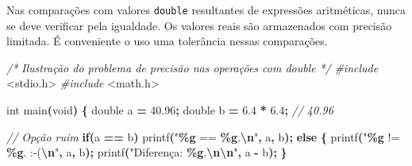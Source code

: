 \documentclass[
  11pt,
  a4paper,
]{scrbook}
\newenvironment{Shaded}{\begin{snugshade}}{\end{snugshade}}
\newcommand{\CommentTok}[1]{\textcolor[rgb]{0.56,0.35,0.01}{\textit{#1}}}
\newcommand{\ControlFlowTok}[1]{\textcolor[rgb]{0.13,0.29,0.53}{\textbf{#1}}}
\newcommand{\DataTypeTok}[1]{\textcolor[rgb]{0.13,0.29,0.53}{#1}}
\newcommand{\FloatTok}[1]{\textcolor[rgb]{0.00,0.00,0.81}{#1}}
\newcommand{\ImportTok}[1]{#1}
\newcommand{\NormalTok}[1]{#1}
\newcommand{\OperatorTok}[1]{\textcolor[rgb]{0.81,0.36,0.00}{\textbf{#1}}}
\newcommand{\PreprocessorTok}[1]{\textcolor[rgb]{0.56,0.35,0.01}{\textit{#1}}}
\newcommand{\SpecialCharTok}[1]{\textcolor[rgb]{0.81,0.36,0.00}{\textbf{#1}}}
\newcommand{\StringTok}[1]{\textcolor[rgb]{0.31,0.60,0.02}{#1}}
\begin{document}
\begin{tcolorbox}[enhanced jigsaw, arc=.35mm, bottomtitle=1mm, colbacktitle=quarto-callout-tip-color!10!white, title=\textcolor{quarto-callout-tip-color}{\faLightbulb}\hspace{0.5em}{Dica}, toprule=.15mm, left=2mm, opacityback=0, colback=white, colframe=quarto-callout-tip-color-frame, opacitybacktitle=0.6, bottomrule=.15mm, leftrule=.75mm, toptitle=1mm, coltitle=black, titlerule=0mm, rightrule=.15mm, breakable]

Nas comparações com valores \texttt{double} resultantes de expressões
aritméticas, nunca se deve verificar pela igualdade. Os valores reais
são armazenados com precisão limitada. É conveniente o uso uma
tolerância nessas comparações.

\begin{Shaded}
\begin{Highlighting}[]
\CommentTok{/* }
\CommentTok{Ilustração do problema de precisão nas operações com double}
\CommentTok{*/}
\PreprocessorTok{\#include }\ImportTok{\textless{}stdio.h\textgreater{}}
\PreprocessorTok{\#include }\ImportTok{\textless{}math.h\textgreater{}}

\DataTypeTok{int}\NormalTok{ main}\OperatorTok{(}\DataTypeTok{void}\OperatorTok{)} \OperatorTok{\{}
    \DataTypeTok{double}\NormalTok{ a }\OperatorTok{=} \FloatTok{40.96}\OperatorTok{;}
    \DataTypeTok{double}\NormalTok{ b }\OperatorTok{=} \FloatTok{6.4} \OperatorTok{*} \FloatTok{6.4}\OperatorTok{;}  \CommentTok{// 40.96}

    \CommentTok{// Opção ruim}
    \ControlFlowTok{if}\OperatorTok{(}\NormalTok{a }\OperatorTok{==}\NormalTok{ b}\OperatorTok{)}
\NormalTok{        printf}\OperatorTok{(}\StringTok{"}\SpecialCharTok{\%g}\StringTok{ == }\SpecialCharTok{\%g}\StringTok{.}\SpecialCharTok{\textbackslash{}n}\StringTok{"}\OperatorTok{,}\NormalTok{ a}\OperatorTok{,}\NormalTok{ b}\OperatorTok{);}
    \ControlFlowTok{else} \OperatorTok{\{}
\NormalTok{        printf}\OperatorTok{(}\StringTok{"}\SpecialCharTok{\%g}\StringTok{ != }\SpecialCharTok{\%g}\StringTok{.  :{-}(}\SpecialCharTok{\textbackslash{}n}\StringTok{"}\OperatorTok{,}\NormalTok{ a}\OperatorTok{,}\NormalTok{ b}\OperatorTok{);}
\NormalTok{        printf}\OperatorTok{(}\StringTok{"Diferença: }\SpecialCharTok{\%g}\StringTok{.}\SpecialCharTok{\textbackslash{}n\textbackslash{}n}\StringTok{"}\OperatorTok{,}\NormalTok{ a }\OperatorTok{{-}}\NormalTok{ b}\OperatorTok{);}
    \OperatorTok{\}}


\end{Highlighting}
\end{Shaded}
\end{tcolorbox}
\end{document}
